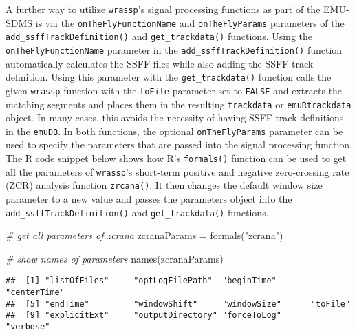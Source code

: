 \documentclass[
]{book}
\newenvironment{Shaded}{\begin{snugshade}}{\end{snugshade}}
\newcommand{\CommentTok}[1]{\textcolor[rgb]{0.56,0.35,0.01}{\textit{#1}}}
\newcommand{\FunctionTok}[1]{\textcolor[rgb]{0.00,0.00,0.00}{#1}}
\newcommand{\NormalTok}[1]{#1}
\newcommand{\OtherTok}[1]{\textcolor[rgb]{0.56,0.35,0.01}{#1}}
\newcommand{\StringTok}[1]{\textcolor[rgb]{0.31,0.60,0.02}{#1}}
\begin{document}
A further way to utilize \texttt{wrassp}'s signal processing functions as part of the EMU-SDMS is via the \texttt{onTheFlyFunctionName} and \texttt{onTheFlyParams} parameters of the \texttt{add\_ssffTrackDefinition()} and \texttt{get\_trackdata()} functions. Using the \texttt{onTheFlyFunctionName} parameter in the \texttt{add\_ssffTrackDefinition()} function automatically calculates the SSFF files while also adding the SSFF track definition. Using this parameter with the \texttt{get\_trackdata()} function calls the given \texttt{wrassp} function with the \texttt{toFile} parameter set to \texttt{FALSE} and extracts the matching segments and places them in the resulting \texttt{trackdata} or \texttt{emuRtrackdata} object. In many cases, this avoids the necessity of having SSFF track definitions in the \texttt{emuDB}. In both functions, the optional \texttt{onTheFlyParams} parameter can be used to specify the parameters that are passed into the signal processing function. The R code snippet below shows how R's \texttt{formals()} function can be used to get all the parameters of \texttt{wrassp}'s short-term positive and negative zero-crossing rate (ZCR) analysis function \texttt{zrcana()}. It then changes the default window size parameter to a new value and passes the parameters object into the \texttt{add\_ssffTrackDefinition()} and \texttt{get\_trackdata()} functions.

\begin{Shaded}
\begin{Highlighting}[]
\CommentTok{\# get all parameters of zcrana}
\NormalTok{zcranaParams }\OtherTok{=} \FunctionTok{formals}\NormalTok{(}\StringTok{"zcrana"}\NormalTok{)}

\CommentTok{\# show names of parameters}
\FunctionTok{names}\NormalTok{(zcranaParams)}
\end{Highlighting}
\end{Shaded}

\begin{verbatim}
##  [1] "listOfFiles"     "optLogFilePath"  "beginTime"       "centerTime"     
##  [5] "endTime"         "windowShift"     "windowSize"      "toFile"         
##  [9] "explicitExt"     "outputDirectory" "forceToLog"      "verbose"
\end{verbatim}
\end{document}
